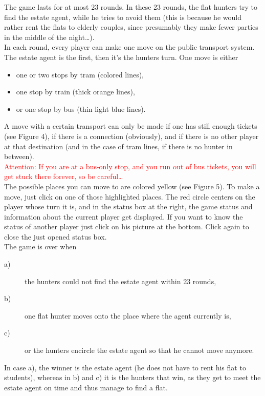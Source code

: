  The game lasts for at most 23 rounds. In these 23 rounds, the flat hunters try to find the estate agent, while he tries to avoid them (this is because he would rather rent the flats to elderly couples, since presumably they make fewer parties in the middle of the night\ldots).\\

In each round, every player can make one move on the public transport system. The estate agent is the first, then it's the hunters turn. One move is either 

\begin{itemize}
  \item  one or two stops by tram (colored lines),
  \item  one stop by train (thick orange lines),
  \item  or one stop by bus (thin light blue lines).
\end{itemize}

 A move with a certain transport can only be made if one has still enough tickets (see Figure 4), if there is a connection (obviously), and if there is no other player at that destination (and in the case of tram lines, if there is no hunter in between).\\

 \textcolor{red}{Attention: If you are at a bus-only stop, and you run out of bus tickets, you will get stuck there forever, so be careful\ldots}\\

The possible places you can move to are colored yellow (see Figure 5). To make a move, just click on one of those highlighted places. The red circle centers on the player whose turn it is, and in the status box at the right, the game status and information about the current player get displayed. If you want to know the status of another player just click on his picture at the bottom. Click again to close the just opened status box.\\

The game is over when

  \begin{description}
    \item[a)]the hunters could not find the estate agent within 23 rounds,
    \item[b)]one flat hunter moves onto the place where the agent currently is,
    \item[c)]or the hunters encircle the estate agent so that he cannot move anymore.
  \end{description}

In case a), the winner is the estate agent (he does not have to rent his flat to students), whereas in b) and c) it is the hunters that win, as they get to meet the estate agent on time and thus manage to find a flat.

